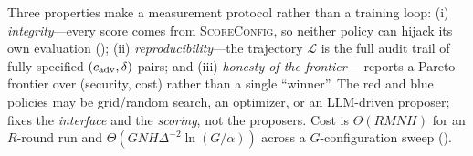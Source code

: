 Three properties make \corb{} a measurement protocol rather than a training loop:
(i) \emph{integrity}---every score comes from \textsc{ScoreConfig}, so neither policy can
hijack its own evaluation (); (ii) \emph{reproducibility}---the
trajectory $\mathcal{L}$ is the full audit trail of fully specified
$(c_{\mathrm{adv}},\delta)$ pairs; and (iii) \emph{honesty of the frontier}---\corb{}
reports a Pareto frontier over (security, cost) rather than a single ``winner''. The red
and blue policies may be grid/random search, an optimizer, or an LLM-driven proposer;
 fixes the \emph{interface} and the \emph{scoring}, not the proposers. Cost is
$\Theta(RMNH)$ for an $R$-round run and $\Theta(GNH\Delta^{-2}\ln(G/\alpha))$ across a
$G$-configuration sweep ().